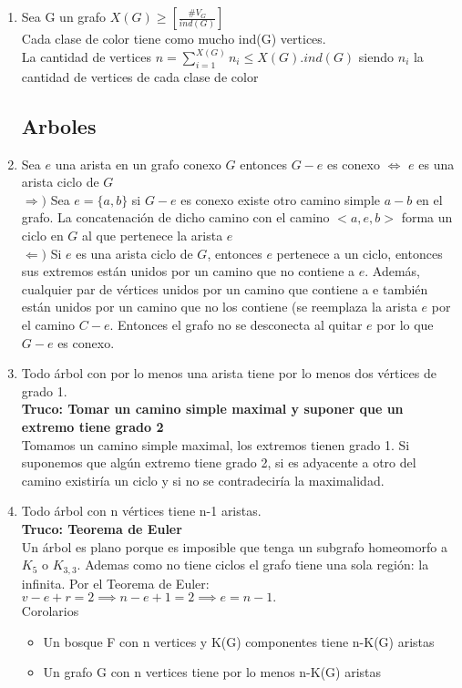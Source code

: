 \documentclass{article}
\begin{document}
\begin{enumerate}
    \item Sea G un grafo $X(G) \geq \left[\frac{\#V_G}{ind(G)}\right]$ \\
    Cada clase de color tiene como mucho ind(G) vertices.\\
    La cantidad de vertices $n=\sum_{i=1}^{X(G)}n_i\leq X(G).ind(G)$ siendo $n_i$ la cantidad de vertices de cada clase de color

\subsection{Arboles}
    \item Sea $e$ una arista en un grafo conexo $G$ entonces $G-e$ es conexo $\iff$ $e$ es una arista ciclo de $G$ \\
        $\Rightarrow)$ Sea $e = \{a,b\}$ si $G-e$ es conexo existe otro camino simple $a-b$ en el
        grafo. La concatenación de dicho camino con el camino $<a,e,b>$ forma un
        ciclo en $G$ al que pertenece la arista $e$ \\
        $\Leftarrow)$ Si $e$ es una arista ciclo de $G$, entonces $e$ pertenece a un ciclo, entonces sus
        extremos están unidos por un camino que no contiene a $e$. Además, cualquier
        par de vértices unidos por un camino que contiene a e también están unidos
        por un camino que no los contiene (se reemplaza la arista $e$ por el camino
        $C-e$. Entonces el grafo no se desconecta al quitar $e$ por lo que $G-e$ es
        conexo.
    
    \item Todo árbol con por lo menos una arista tiene por lo menos dos vértices de grado 1. \\
    \textbf{Truco: Tomar un camino simple maximal y suponer que un extremo tiene grado 2} \\
    Tomamos un camino simple maximal, los extremos tienen grado 1. Si suponemos que algún extremo tiene grado 2, si es adyacente a otro del camino existiría un ciclo y si no se contradeciría la maximalidad. 
    
    \item Todo árbol con n vértices tiene n-1 aristas. \\
    \textbf{Truco: Teorema de Euler} \\
    Un árbol es plano porque es imposible que tenga un subgrafo homeomorfo a $K_5$ o $K_{3,3}$. Ademas como no tiene ciclos el grafo tiene una sola región: la infinita. Por el Teorema de Euler: $v - e + r =2 \implies n - e + 1 = 2 \implies e = n - 1.$ \\
    Corolarios 
    \begin{itemize}
        \item Un bosque F con n vertices y K(G) componentes tiene n-K(G) aristas
        \item Un grafo G con n vertices tiene por lo menos n-K(G) aristas
    \end{itemize}
    

\end{enumerate}
\end{document}
